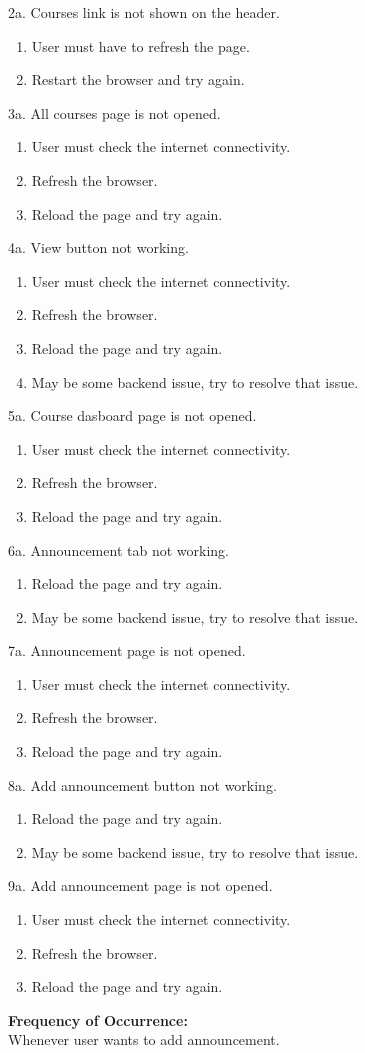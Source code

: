 \documentclass[12pt]{article}
\begin{document}
2a. Courses link is not shown on the header.
\begin{enumerate}
\item User must have to refresh the page.
\item Restart the browser and try again.
\end{enumerate} 
3a. All courses page is not opened.
\begin{enumerate}
\item User must check the internet connectivity.
\item Refresh the browser.
\item Reload the page and try again.
\end{enumerate}
4a. View button not working.
\begin{enumerate}
\item User must check the internet connectivity.
\item Refresh the browser.
\item Reload the page and try again.
\item May be some backend issue, try to resolve that issue.
\end{enumerate}
5a. Course dasboard page is not opened.
\begin{enumerate}
\item User must check the internet connectivity.
\item Refresh the browser.
\item Reload the page and try again.
\end{enumerate}
6a. Announcement tab not working.
\begin{enumerate}
\item Reload the page and try again.
\item May be some backend issue, try to resolve that issue.
\end{enumerate}
\newpage
7a. Announcement page is not opened.
\begin{enumerate}
\item User must check the internet connectivity.
\item Refresh the browser.
\item Reload the page and try again.
\end{enumerate}
8a. Add announcement button not working.
\begin{enumerate}
\item Reload the page and try again.
\item May be some backend issue, try to resolve that issue.
\end{enumerate}
9a. Add announcement page is not opened.
\begin{enumerate}
\item User must check the internet connectivity.
\item Refresh the browser.
\item Reload the page and try again.
\end{enumerate}
\textbf{Frequency of Occurrence:}\\
Whenever user wants to add announcement.
\end{document}
